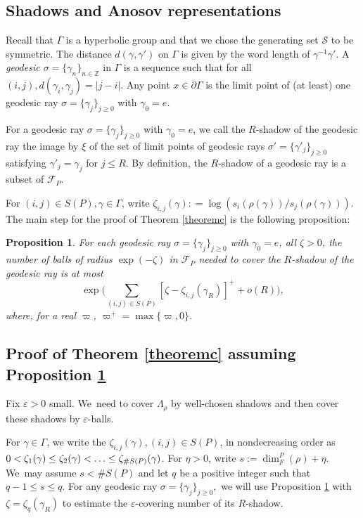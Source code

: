 \documentclass[JEP,XML,SOM,Unicode,NoEqCountersInSection,published]{cedram}
\newtheorem{proposition}[theorem]{Proposition}
\newcommand{\Z}{\mathbb{Z}}
\newcommand{\F}{\mathcal{F}}
\newcommand{\cS}{\mathcal{S}}
\let\e\varepsilon
\let\G\Gamma
\let\g\gamma
\let\pp\partial
\let\La\Lambda
\let\s\sigma
\begin{document}
\subsection{Shadows and Anosov representations}

Recall that \(\G\) is a hyperbolic group and that we chose the generating set \(\cS\) to be symmetric. The distance \(d(\g,\g') \) on \(\G\) is given by the word length of \(\g^{-1} \g'\). A {\it{ geodesic }} \(\s = \{\g_n\}_{n \in \Z} \) in \(\G\) is a sequence such that for all \((i,j), d(\g_i, \g_j) =| j-i|\). Any point \(x \in \pp \G\) is the limit point of (at least) one geodesic ray \(\s =\{ \g_j \}_{j \geq 0} \) with \(\g_0 = e\).

For a geodesic ray \(\s =\{ \g_j \}_{j \geq 0} \) with \(\g_0 = e\), we call the \(R\)-shadow of the geodesic ray the image by \(\xi \) of the set of limit points of geodesic rays \(\s ' = \{ \g'_j \}_{j \geq 0} \) satisfying \(\g'_j = \g_j \) for \(j\leq R\). By definition, the \(R\)-shadow of a geodesic ray is a subset of \(\F_{P}\).

For \((i,j) \in S(P),\g \in \G\), write \(\zeta_{i,j}(\g): = \log(s_i(\rho(\gamma))/s_j(\rho(\gamma)))\).
The main step for the proof of Theorem \ref{theoremc} is the following proposition:
\begin{proposition}\label{covering} For each geodesic ray \(\s =\{ \g_j \}_{j \geq 0} \) with \(\g_0 = e\), all \(\zeta >0\), the number of balls of radius \(\exp (-\zeta) \) in \(\F_{P}\) needed to cover the \(R\)-shadow of the geodesic ray is at most
\[
 \exp \biggl(\sum_{(i,j) \in S(P)} [ \zeta - \zeta_{i,j}(\g_R) ]^+ + o(R) \biggr),
\]
where, for a real \(\varpi\), \(\varpi^+ = \max \{ \varpi, 0\} \). \end{proposition}

\subsection{Proof of Theorem \ref{theoremc} assuming Proposition \ref{covering}}

Fix \(\e >0 \) small. We~need to cover \(\La_\rho \) by well-chosen shadows and then cover these shadows by \(\e\)-balls.

For \(\g \in \G\), we write the \(\zeta_{i,j}(\g), (i,j) \in S(P) \), in nondecreasing order as \(0<\nobreak \zeta_1(\g) \leq \zeta_2 (\g) <\ldots \leq \zeta_{\# S(P)} (\g)\). For \(\eta >0\), write \(s:= \dim_F^P (\rho) + \eta \). We~may assume \(s<\#S(P) \) and let \(q\) be a positive integer such that \(q-1 \leq s \leq q \). For any geodesic ray \(\s =\{ \g_j \}_{j \geq 0}, \) we will use Proposition \ref{covering} with \(\zeta = \zeta_q(\g_R) \) to estimate the \(\e\)-covering number of its \(R\)-shadow.
\end{document}
